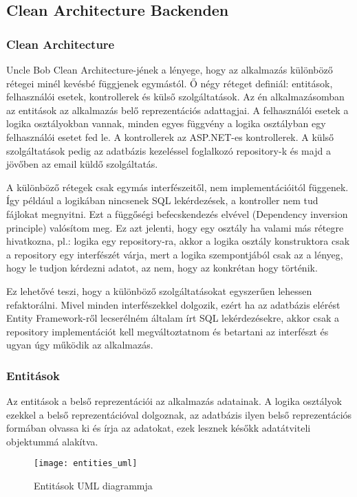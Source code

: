 \subsection{Clean Architecture Backenden}
\subsubsection{Clean Architecture}
Uncle Bob Clean Architecture\cite{cleanArchitecturePost}-jének a lényege, hogy az alkalmazás különböző rétegei minél kevésbé függjenek egymástól. Ő négy réteget definiál: entitások, felhasználói esetek, kontrollerek és külső szolgáltatások. Az én alkalmazásomban az entitások az alkalmazás belő reprezentációs adattagjai. A felhasználói esetek a logika osztályokban vannak, minden egyes függvény a logika osztályban egy felhasználói esetet fed le. A kontrollerek az ASP.NET-es kontrollerek. A külső szolgáltatások pedig az adatbázis kezeléssel foglalkozó repository-k és majd a jövőben az email küldő szolgáltatás.

A különböző rétegek csak egymás interfészeitől, nem implementációitól függenek. Így például a logikában nincsenek SQL lekérdezések, a kontroller nem tud fájlokat megnyitni. Ezt a függőségi befecskendezés elvével (Dependency inversion principle) valósítom meg. Ez azt jelenti, hogy egy osztály ha valami más rétegre hivatkozna, pl.: logika egy repository-ra, akkor a logika osztály konstruktora csak a repository egy interfészét várja, mert a logika szempontjából csak az a lényeg, hogy le tudjon kérdezni adatot, az nem, hogy az konkrétan hogy történik.

Ez lehetővé teszi, hogy a különböző szolgáltatásokat egyszerűen lehessen refaktorálni. Mivel minden interfészekkel dolgozik, ezért ha az adatbázis elérést Entity Framework-ről lecserélném általam írt SQL lekérdezésekre, akkor csak a repository implementációt kell megváltoztatnom és betartani az interfészt és ugyan úgy működik az alkalmazás.

\clearpage

\subsubsection{Entitások}
Az entitások a belső reprezentációi az alkalmazás adatainak. A logika osztályok ezekkel a belső reprezentációval dolgoznak, az adatbázis ilyen belső reprezentációs formában olvassa ki és írja az adatokat, ezek lesznek későkk adatátviteli objektummá alakítva.

\begin{figure}[H]
	\centering
	\texttt{[image: entities\_uml]}
	\caption{Entitások UML diagrammja}
	\label{fig:entities}
\end{figure}

